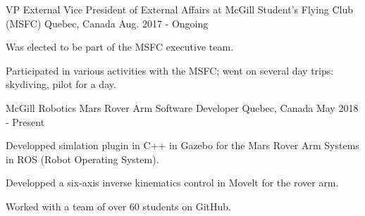 
\begin{cventries}
\cventry
    {VP External}
    {Vice President of External Affairs at McGill Student's Flying Club (MSFC)}
    {Quebec, Canada}
    {Aug. 2017 - Ongoing}
    {
      \begin{cvitems}
        \item {Was elected to be part of the MSFC executive team.}
        \item {Participated in various activities with the MSFC; went on several day trips: skydiving, pilot for a day.}
      \end{cvitems}
    }
\cventry
    {McGill Robotics}
    {Mars Rover Arm Software Developer}
    {Quebec, Canada}
    {May 2018 - Present}
    {
      \begin{cvitems}
        \item {Developped simlation plugin in C++ in Gazebo for the Mars Rover Arm Systems in ROS (Robot Operating System).}
        \item {Developped a six-axis inverse kinematics control in Movelt for the rover arm.}
        \item {Worked with a team of over 60 students on GitHub.}
      \end{cvitems}
    }
\end{cventries}
